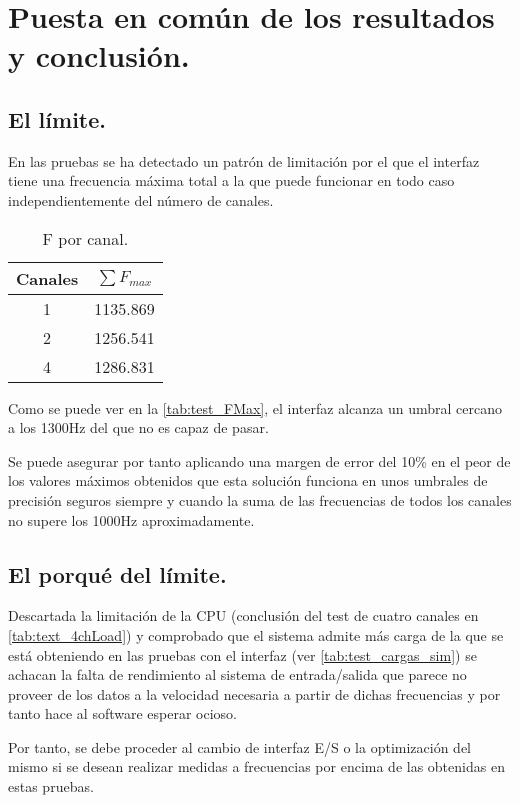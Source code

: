 \section{Puesta en común de los resultados y conclusión.}
	\subsection{El límite.}
		En las pruebas se ha detectado un patrón de limitación por el que el interfaz tiene una frecuencia máxima total a la que puede funcionar en todo caso independientemente del número de canales.\\
\begin{wraptable}{l}{0.28\textwidth}
  \begin{tabular}{| c | c |}
  	\hline
  	Canales & $ \sum F_{max} $ 	\\ \hline
  	1			&	1135.869				\\
  	2			&	1256.541				\\
  	4			&	1286.831				\\	 \hline
  \end{tabular}
  \caption[Frecuencias máximas obtenidas por cada canal.]{F por canal.}
  \label{tab:test_FMax}
\end{wraptable}
Como se puede ver en la \autoref{tab:test_FMax}, el interfaz alcanza un umbral cercano a los 1300Hz  del que no es capaz de pasar. 

Se puede asegurar por tanto aplicando una margen de error del 10\% en el peor de los valores máximos obtenidos que esta solución funciona en unos umbrales de precisión seguros siempre y cuando la suma de las frecuencias de todos los canales no supere los 1000Hz aproximadamente.
\linebreak
	\subsection{El porqué del límite.}
Descartada la limitación de la CPU (conclusión del test de cuatro canales en \ref{tab:text_4chLoad}) y comprobado que el sistema admite más carga de la que se está obteniendo en las pruebas con el interfaz (ver \autoref{tab:test_cargas_sim}) se achacan la falta de rendimiento al sistema de entrada/salida que parece no proveer de los datos a la velocidad necesaria a partir de dichas frecuencias y por tanto hace al software esperar ocioso.

Por tanto, se debe proceder al cambio de interfaz E/S o la optimización del mismo si se desean realizar medidas a frecuencias por encima de las obtenidas en estas pruebas.